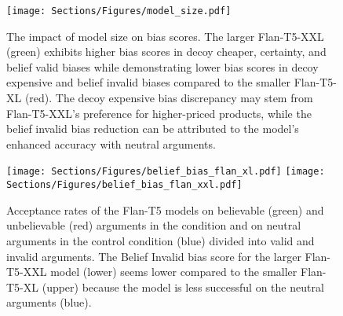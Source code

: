 \begin{figure}[t!]
\centering
\texttt{[image: Sections/Figures/model\_size.pdf]}
\caption{
The impact of model size on bias scores. The larger Flan-T5-XXL (green) exhibits higher bias scores in decoy cheaper, certainty, and belief valid biases while demonstrating lower bias scores in decoy expensive and belief invalid biases compared to the smaller Flan-T5-XL (red). The decoy expensive bias discrepancy may stem from Flan-T5-XXL's preference for higher-priced products, while the belief invalid bias reduction can be attributed to the model's enhanced accuracy with neutral arguments.}
\label{fig:model_size}
\end{figure}


\begin{figure}[th!]
\centering
\texttt{[image: Sections/Figures/belief\_bias\_flan\_xl.pdf]}
\texttt{[image: Sections/Figures/belief\_bias\_flan\_xxl.pdf]}
\caption{Acceptance rates of the Flan-T5 models on believable (green) and unbelievable (red) arguments in the \biaseddataset condition and on neutral arguments in the control condition (blue) divided into valid and invalid arguments. The Belief Invalid bias score for the larger Flan-T5-XXL model (lower) seems lower compared to the smaller Flan-T5-XL (upper) because the model is less successful on the neutral arguments (blue).}
\label{fig:model_size_compare}
\end{figure}